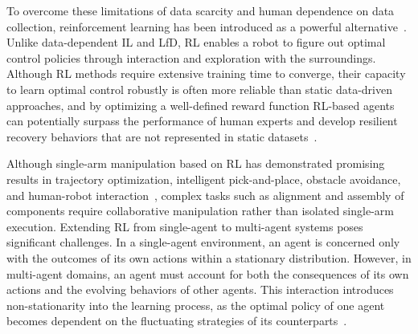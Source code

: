 To overcome these limitations of data scarcity and human dependence on data collection,
reinforcement learning has been introduced as a powerful alternative~\citep{kober2013reinforcement}.
Unlike data-dependent IL and LfD, RL enables a robot to figure out optimal control policies through
interaction and exploration with the surroundings. Although RL methods require extensive training
time to converge, their capacity to learn optimal control robustly is often more reliable than
static data-driven approaches, and by optimizing a well-defined reward function RL-based agents can
potentially surpass the performance of human experts and develop resilient recovery behaviors that
are not represented in static datasets~\citep{gu2017deep}.

Although single-arm manipulation based on RL has demonstrated promising results in trajectory
optimization, intelligent pick-and-place, obstacle avoidance, and human-robot
interaction~\citep{yang2025gbagcrl}, complex tasks such as alignment and assembly of components
require collaborative manipulation rather than isolated single-arm execution. Extending RL from
single-agent to multi-agent systems poses significant challenges. In a single-agent environment, an
agent is concerned only with the outcomes of its own actions within a stationary distribution.
However, in multi-agent domains, an agent must account for both the consequences of its own actions
and the evolving behaviors of other agents. This interaction introduces non-stationarity into the
learning process, as the optimal policy of one agent becomes dependent on the fluctuating strategies
of its counterparts~\citep{nguyen2020deep}.

